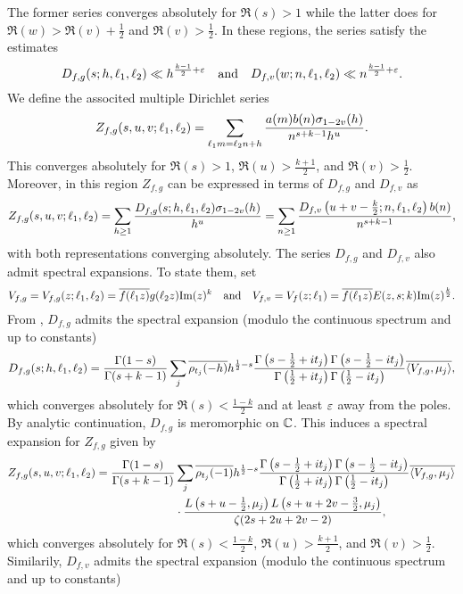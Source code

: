 \documentclass[12pt,reqno,oneside]{amsart}
\begin{document}
  The former series converges absolutely for $\Re(s) > 1$ while the latter does for $\Re(w) > \Re(v)+\frac{1}{2}$ and $\Re(v) > \frac{1}{2}$. In these regions, the series satisfy the estimates
  \[
    D_{f,g}(s;h,\ell_{1},\ell_{2}) \ll h^{\frac{k-1}{2}+\varepsilon} \quad \text{and} \quad D_{f,v}(w;n,\ell_{1},\ell_{2}) \ll n^{\frac{k-1}{2}+\varepsilon}.
  \]
  We define the associted multiple Dirichlet series
  \[
    Z_{f,g}(s,u,v;\ell_{1},\ell_{2}) = \sum_{\ell_{1}m = \ell_{2}n+h}\frac{a(m)b(n)\sigma_{1-2v}(h)}{n^{s+k-1}h^{u}}.
  \]
  This converges absolutely for $\Re(s) > 1$, $\Re(u) > \frac{k+1}{2}$, and $\Re(v) > \frac{1}{2}$. Moreover, in this region $Z_{f,g}$ can be expressed in terms of $D_{f,g}$ and $D_{f,v}$ as
  \[
    Z_{f,g}(s,u,v;\ell_{1},\ell_{2}) = \sum_{h \ge 1}\frac{D_{f,g}(s;h,\ell_{1},\ell_{2})\sigma_{1-2v}(h)}{h^{u}} = \sum_{n \ge 1}\frac{D_{f,v}\left(u+v-\frac{k}{2};n,\ell_{1},\ell_{2}\right)b(n)}{n^{s+k-1}},
  \]
  with both representations converging absolutely. The series $D_{f,g}$ and $D_{f,v}$ also admit spectral expansions. To state them, set
  \[
    V_{f,g} = V_{f,g}(z;\ell_{1},\ell_{2}) = \overline{f(\ell_{1}z)}g(\ell_{2}z)\mathrm{Im}(z)^{k} \quad \text{and} \quad V_{f,v} = V_{f}(z;\ell_{1}) = \overline{f(\ell_{1}z)}E(z,s;k)\mathrm{Im}(z)^{\frac{k}{2}}.
  \]
  From \cite{HHR}, $D_{f,g}$ admits the spectral expansion (modulo the continuous spectrum and up to constants)
  \[
    D_{f,g}(s;h,\ell_{1},\ell_{2}) = \frac{\Gamma(1-s)}{\Gamma(s+k-1)}\sum_{j}\overline{\rho_{t_{j}}(-h)}h^{\frac{1}{2}-s}\frac{\Gamma\left(s-\frac{1}{2}+it_{j}\right)\Gamma\left(s-\frac{1}{2}-it_{j}\right)}{\Gamma\left(\frac{1}{2}+it_{j}\right)\Gamma\left(\frac{1}{2}-it_{j}\right)}\overline{\langle V_{f,g},\mu_{j}\rangle},
  \]
  which converges absolutely for $\Re(s) < \frac{1-k}{2}$ and at least $\varepsilon$ away from the poles. By analytic continuation, $D_{f,g}$ is meromorphic on $\mathbb{C}$. This induces a spectral expansion for $Z_{f,g}$ given by
  \begin{align*}
    Z_{f,g}(s,u,v;\ell_{1},\ell_{2}) = \frac{\Gamma(1-s)}{\Gamma(s+k-1)}&\sum_{j}\overline{\rho_{t_{j}}(-1)}h^{\frac{1}{2}-s}\frac{\Gamma\left(s-\frac{1}{2}+it_{j}\right)\Gamma\left(s-\frac{1}{2}-it_{j}\right)}{\Gamma\left(\frac{1}{2}+it_{j}\right)\Gamma\left(\frac{1}{2}-it_{j}\right)}\overline{\langle V_{f,g},\mu_{j}\rangle} \\
    &\cdot \frac{L\left(s+u-\frac{1}{2},\mu_{j}\right)L\left(s+u+2v-\frac{3}{2},\mu_{j}\right)}{\zeta(2s+2u+2v-2)},
  \end{align*}
  which converges absolutely for $\Re(s) < \frac{1-k}{2}$, $\Re(u) > \frac{k+1}{2}$, and $\Re(v) > \frac{1}{2}$. Similarily, $D_{f,v}$ admits the spectral expansion (modulo the continuous spectrum and up to constants)
\end{document}
